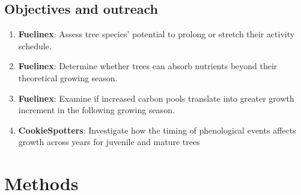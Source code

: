 \documentclass{article}
\begin{document}
\subsection{Objectives and outreach}
\begin {enumerate}
	\item \textbf{Fuelinex}: Assess tree species’ potential to prolong or stretch their activity schedule.
	\item \textbf{Fuelinex}:  Determine whether trees can absorb nutrients beyond their theoretical growing season.
	\item \textbf{Fuelinex}:  Examine if increased carbon pools translate into greater growth increment in the following growing season. 
	\item \textbf{CookieSpotters}: Investigate how the timing of phenological events affects growth across years for juvenile and mature trees
\end {enumerate}

\section{Methods}

\end{document}
